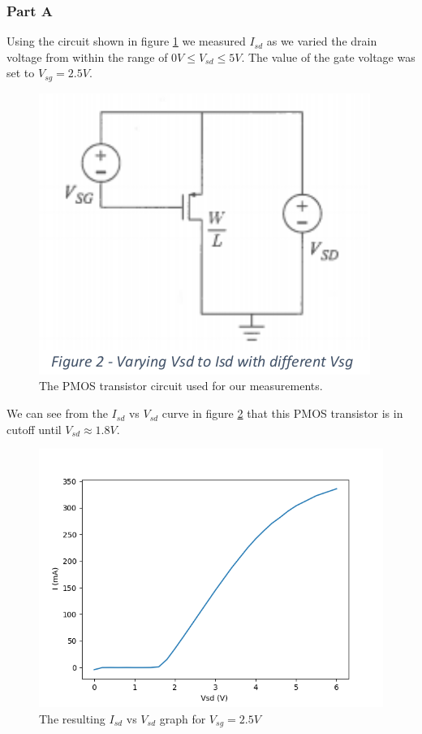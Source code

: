 \subsubsection{Part A}
Using the circuit shown in figure \ref{fig:pmos_circuit} we measured $I_{sd}$ as we varied the drain voltage from within the range of $0 V \le V_{sd} \le 5 V$. 
The value of the gate voltage was set to $V_{sg} = 2.5V$. 
\\

\FloatBarrier

\begin{figure}[h!]
	\centering
	\includegraphics[scale=0.75]{./images/pmos_circuit}
	\caption{The PMOS transistor circuit used for our measurements.}
	\label{fig:pmos_circuit}
\end{figure}

\FloatBarrier
We can see from the $I_{sd}$ vs $V_{sd}$ curve in figure \ref{fig:pmos} that this PMOS transistor is in cutoff until $V_{sd} \approx 1.8 V$. 

\FloatBarrier

\begin{figure}[h!]
	\centering
	\includegraphics[scale=0.75]{./data/pmos.png}
	\caption{The resulting $I_{sd}$ vs $V_{sd}$ graph for $V_{sg}=2.5V$}
	\label{fig:pmos}
\end{figure}

